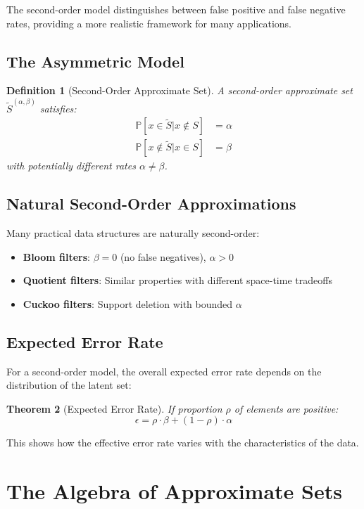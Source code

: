 \documentclass[11pt]{article}
\newtheorem{theorem}{Theorem}[section]
\newtheorem{definition}[theorem]{Definition}
\newcommand{\observed}[1]{\tilde{#1}}  %
\newcommand{\prob}[1]{\mathbb{P}\left[#1\right]}
\newcommand{\fprate}{\alpha}  %
\newcommand{\fnrate}{\beta}   %
\begin{document}
The second-order model distinguishes between false positive and false negative rates, providing a more realistic framework for many applications.

\subsection{The Asymmetric Model}

\begin{definition}[Second-Order Approximate Set]
A second-order approximate set $\observed{S}^{(\fprate,\fnrate)}$ satisfies:
\begin{align}
\prob{x \in \observed{S} | x \notin S} &= \fprate \\
\prob{x \notin \observed{S} | x \in S} &= \fnrate
\end{align}
with potentially different rates $\fprate \neq \fnrate$.
\end{definition}

\subsection{Natural Second-Order Approximations}

Many practical data structures are naturally second-order:
\begin{itemize}
\item \textbf{Bloom filters}: $\fnrate = 0$ (no false negatives), $\fprate > 0$
\item \textbf{Quotient filters}: Similar properties with different space-time tradeoffs
\item \textbf{Cuckoo filters}: Support deletion with bounded $\fprate$
\end{itemize}

\subsection{Expected Error Rate}

For a second-order model, the overall expected error rate depends on the distribution of the latent set:

\begin{theorem}[Expected Error Rate]
If proportion $\rho$ of elements are positive:
$$\epsilon = \rho \cdot \fnrate + (1-\rho) \cdot \fprate$$
\end{theorem}

This shows how the effective error rate varies with the characteristics of the data.

\section{The Algebra of Approximate Sets}
\label{sec:algebra}
\end{document}
